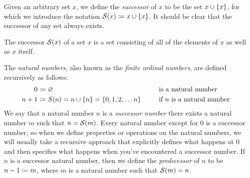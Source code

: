 \begin{definition}
    Given an arbitrary set $x$, we define the \emph{successor} of $x$ to be the set $x \union \set*{x}$,
    for which we introduce the notation $\successor{x} \defn x \union \set*{x}$.
    It should be clear that the successor of any set always exists.

    \begin{note}
        The successor $\successor{x}$ of a set $x$ is a set consisting of
        all of the elements of $x$ as well as $x$ itself.
    \end{note}
\end{definition}

\begin{definition}
    The \emph{natural numbers}, also known as the \emph{finite ordinal numbers},
    are defined recursively as follows:
    \begin{alignat*}{2}
        0 &\defn \emptyset &&\text{ is a natural number} \\
        n + 1 &\defn S(n)
               = n \union \set*{n}
               = \set{0, 1, 2, \dots n}~~~~&&\text{ if } n \text{ is a natural number}
    \end{alignat*}
    We say that a natural number $n$ is a \emph{successor number}
    \iffbydefn there exists a natural number $m$ such that $n = \successor{m}$.
    Every natural number except for $0$ is a successor number,
    so when we define properties or operations on the natural numbers,
    we will usually take a recursive approach that explicitly defines what happens at $0$
    and then specifies what happens when you've encountered a successor number.
    If $n$ is a successor natural number,
    then we define the \emph{predecessor} of $n$ to be $n - 1 \coloneqq m$,
    where $m$ is a natural number such that $\successor{m} = n$.
\end{definition}

%     

